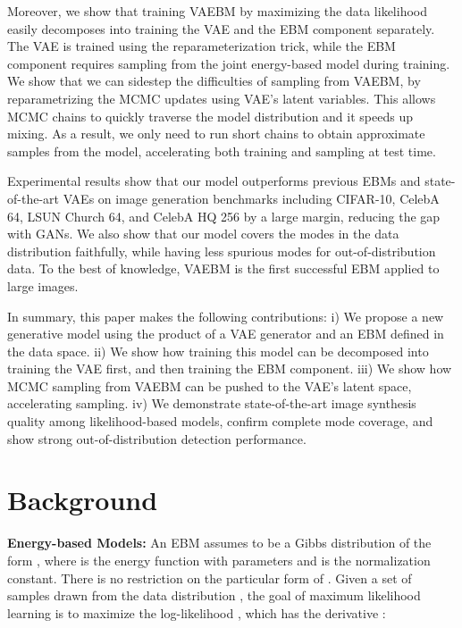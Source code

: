 \documentclass{article} \usepackage{iclr2021_conference,times}
\begin{document}
Moreover, we show that training VAEBM by maximizing the data likelihood easily decomposes into training the VAE and the EBM component separately. The VAE is trained using the reparameterization trick, while the EBM component requires sampling from the joint energy-based model during training. We show that we can sidestep the difficulties of sampling from VAEBM, by reparametrizing the MCMC updates using VAE's latent variables. 
This allows MCMC chains to quickly traverse the model distribution and it speeds up mixing.
As a result, we only need to run short chains to obtain approximate samples from the model, accelerating both training and sampling at test time. 

Experimental results show that our model outperforms previous EBMs and state-of-the-art VAEs on image generation benchmarks including CIFAR-10, CelebA 64, LSUN Church 64, and CelebA HQ 256 by a large margin, reducing the gap with GANs. We also show that our model covers the modes in the data distribution faithfully, while having less spurious modes for out-of-distribution data. To the best of knowledge, VAEBM is the first successful EBM applied to large images.

In summary, this paper makes the following contributions: i) We propose a new generative model using the product of a VAE generator and an EBM defined in the data space. ii) We show how training this model can be decomposed into training the VAE first, and then training the EBM component. iii) We show how MCMC sampling from VAEBM can be pushed to the VAE's latent space, 
accelerating sampling. iv) We demonstrate state-of-the-art image synthesis quality among likelihood-based models, confirm complete mode coverage, and show strong out-of-distribution detection performance.





 \section{Background}\label{sec:background}


\textbf{Energy-based Models:} An EBM assumes  to be a Gibbs distribution of the form , where  is the energy function with parameters  and  is the normalization constant. There is no restriction on the particular form of . Given a set of samples drawn from the data distribution , the goal of maximum likelihood learning is to maximize the log-likelihood , which has the derivative \citep{woodford2006notes}:
\end{document}
